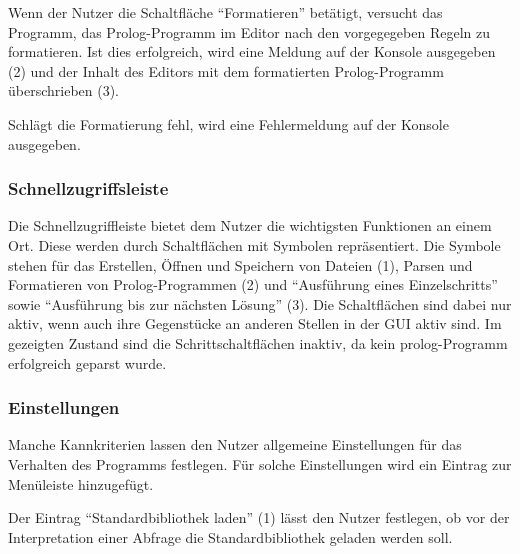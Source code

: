 \documentclass[parskip=full,11pt,twoside]{scrartcl}
\begin{document}
Wenn der Nutzer die Schaltfläche \enquote{Formatieren} betätigt, versucht das Programm, das Prolog-Programm im Editor nach den vorgegegeben Regeln zu formatieren.
Ist dies erfolgreich, wird eine Meldung auf der Konsole ausgegeben (2) und der Inhalt des Editors mit dem formatierten Prolog-Programm überschrieben (3).

Schlägt die Formatierung fehl, wird eine Fehlermeldung auf der Konsole ausgegeben.

\subsubsection{Schnellzugriffsleiste}

\begin{minipage}{\linewidth}
\end{minipage}

Die Schnellzugriffleiste bietet dem Nutzer die wichtigsten Funktionen an einem Ort.
Diese werden durch Schaltflächen mit Symbolen repräsentiert.
Die Symbole stehen für das Erstellen, Öffnen und Speichern von Dateien (1), Parsen und Formatieren von Prolog-Programmen (2) und \enquote{Ausführung eines Einzelschritts} sowie \enquote{Ausführung bis zur nächsten Lösung} (3).
Die Schaltflächen sind dabei nur aktiv, wenn auch ihre Gegenstücke an anderen Stellen in der GUI aktiv sind.
Im gezeigten Zustand sind die Schrittschaltflächen inaktiv, da kein prolog-Programm erfolgreich geparst wurde.

\subsubsection{Einstellungen}

Manche Kannkriterien lassen den Nutzer allgemeine Einstellungen für das Verhalten des Programms festlegen.
Für solche Einstellungen wird ein Eintrag zur Menüleiste hinzugefügt.

\begin{minipage}{\linewidth}
\end{minipage}

Der Eintrag \enquote{Standardbibliothek laden} (1) lässt den Nutzer festlegen, ob vor der Interpretation einer Abfrage die Standardbibliothek geladen werden soll.
\end{document}
